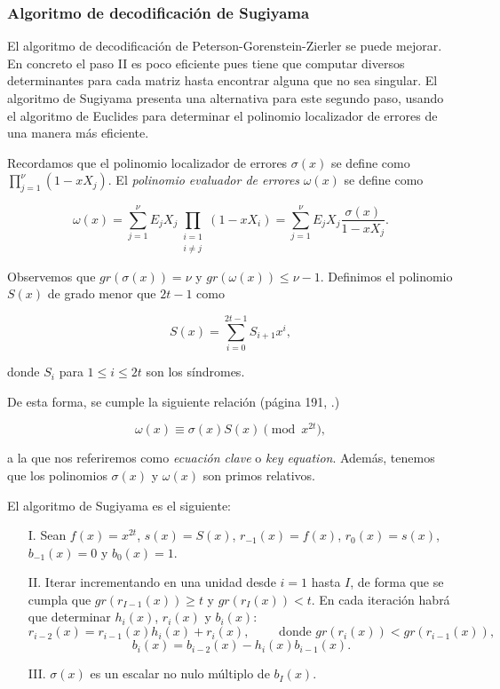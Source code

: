 \subsubsection{Algoritmo de decodificación de Sugiyama}

El algoritmo de decodificación de Peterson-Gorenstein-Zierler se puede mejorar. En concreto el paso II es poco eficiente pues tiene que computar diversos determinantes para cada matriz hasta encontrar alguna que no sea singular. El algoritmo de Sugiyama presenta una alternativa para este segundo paso, usando el algoritmo de Euclides para determinar el polinomio localizador de errores de una manera más eficiente.

Recordamos que el polinomio localizador de errores $\sigma(x)$ se define como $\prod_{j=1}^{\nu} (1 - xX_j)$. El \emph{polinomio evaluador de errores} $\omega(x)$ se define como

\begin{equation}
    \label{def:polinomio_evaluador_errores}
    \omega(x) = \sum_{j=1}^{\nu} E_j X_j \prod_{\substack{i=1\\ i \neq j}} (1 - xX_i) = \sum_{j=1}^{\nu} E_j X_j \frac{\sigma(x)}{1 - xX_j}.
\end{equation}

Observemos que $gr(\sigma(x)) = \nu$ y $gr(\omega(x)) \leq \nu - 1$. Definimos el polinomio $S(x)$ de grado menor que $2t - 1$ como

$$S(x) = \sum_{i=0}^{2t - 1} S_{i+1} x^i,$$

donde $S_i$ para $1 \leq i \leq 2t$ son los síndromes.

De esta forma, se cumple la siguiente relación (página 191, \cite{Huffman_Pless_2010}.)

$$\omega(x) \equiv \sigma(x) S(x) \pmod{x^{2t}},$$

a la que nos referiremos como \emph{ecuación clave} o \emph{key equation}. Además, tenemos que los polinomios $\sigma(x)$ y $\omega(x)$ son primos relativos.

El algoritmo de Sugiyama es el siguiente:

\begin{itemize}
    \item[I.] Sean $f(x) = x^{2t}$, $s(x) = S(x)$, $r_{-1}(x) = f(x)$, $r_0(x) = s(x)$, $b_{-1}(x) = 0$ y $b_0(x) = 1$.
    \item[II.] Iterar incrementando en una unidad desde $i = 1$ hasta $I$, de forma que se cumpla que $gr(r_{I-1}(x)) \geq t$ y $gr(r_I(x)) < t$. En cada iteración habrá que determinar $h_i(x)$, $r_i(x)$ y $b_i(x)$:
        $$r_{i-2}(x) = r_{i-1}(x) h_i(x) + r_i (x), \qquad \text{ donde } gr(r_i(x)) < gr(r_{i-1}(x)),$$
        $$b_i(x) = b_{i-2}(x) - h_i(x) b_{i-1}(x).$$
    \item[III.] $\sigma(x)$ es un escalar no nulo múltiplo de $b_I(x)$. 
\end{itemize}

